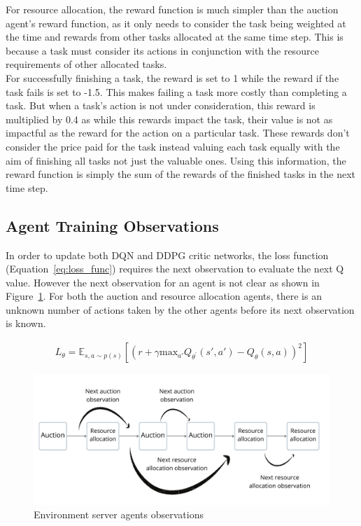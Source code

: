 For resource allocation, the reward function is much simpler than the auction agent's reward function, as it only needs
to consider the task being weighted at the time and rewards from other tasks allocated at the same time step. This is
because a task must consider its actions in conjunction with the resource requirements of other allocated tasks. \\
For successfully finishing a task, the reward is set to 1 while the reward if the task fails is set to -1.5. This makes
failing a task more costly than completing a task. But when a task's action is not under consideration, this reward is
multiplied by 0.4 as while this rewards impact the task, their value is not as impactful as the reward for the action
on a particular task. These rewards don't consider the price paid for the task instead valuing each task equally with
the aim of finishing all tasks not just the valuable ones. Using this information,
the reward function is simply the sum of the rewards of the finished tasks in the next time step.

\subsection{Agent Training Observations}
\label{subsec:agent-training-observations}
In order to update both DQN and DDPG critic networks, the loss function (Equation~\eqref{eq:loss_func})
requires the next observation to evaluate the next Q value. However the next observation for an
agent is not clear as shown in Figure~\ref{fig:environment-observations}. For both the auction and resource allocation
agents, there is an unknown number of actions taken by the other agents before its next observation is known.

\begin{align}
    L_{\theta} = \mathbb{E}_{s, a \sim p(s)} \left[ (r + \gamma \text{max}_{a'} Q_{\theta^{'}}(s', a') - Q_{\theta}(s, a))^2 \right] \label{eq:loss_func}
\end{align}

\begin{figure}[h]
    \centering
    \includegraphics[width=14cm]{figures/4_implementation_figs/env_server_agents_observations.pdf}
    \caption{Environment server agents observations}
    \label{fig:environment-observations}
\end{figure}

